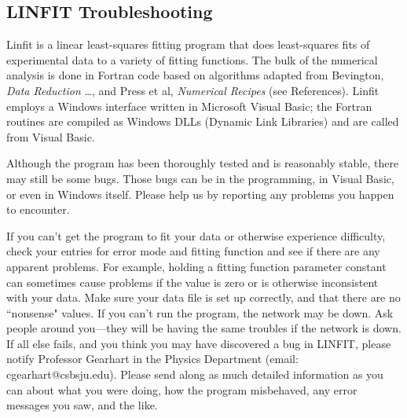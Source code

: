 \subsection*{LINFIT Troubleshooting}

Linfit is a linear least-squares fitting program that does
least-squares fits of experimental data to a variety of fitting
functions.  The bulk of the numerical analysis is done in Fortran code
based on algorithms adapted from Bevington, {\em Data Reduction}
\ldots,
and Press et al, {\em Numerical Recipes} (see References).  Linfit
employs
a Windows interface written in Microsoft Visual Basic; the Fortran
routines are compiled as Windows DLLs (Dynamic Link Libraries) and are
called from Visual Basic.

Although the program has been thoroughly tested and is reasonably
stable, there may still be some bugs.  Those bugs can be in the
programming, in Visual Basic, or even in Windows itself.  Please help
us by reporting any problems you happen to encounter.

If you can't get the program to fit your data or otherwise experience
difficulty, check your entries for error mode and fitting function
and see if there are any apparent problems.  For example, holding
a fitting function parameter constant can sometimes cause problems
if the value is zero or is otherwise inconsistent with your data.
Make sure your data file
is set up correctly, and that there are no ``nonsense" values.  If you
 can't run the program, the network may be down.  Ask people around
you---they will be having the same troubles if the network is down.  If all
else fails, and you think you may have discovered a bug in LINFIT,
please notify Professor Gearhart in the Physics Department (email:
cgearhart@csbsju.edu).  Please send along as much detailed information
as you can about what you were doing, how the program misbehaved, any
error messages you saw, and the like.





